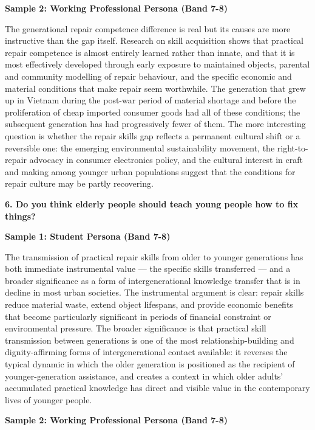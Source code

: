 \textbf{Sample 2: Working Professional Persona (Band 7-8)}

The generational repair competence difference is real but its causes are more instructive than the gap itself. Research on skill acquisition shows that practical repair competence is almost entirely learned rather than innate, and that it is most effectively developed through early exposure to maintained objects, parental and community modelling of repair behaviour, and the specific economic and material conditions that make repair seem worthwhile. The generation that grew up in Vietnam during the post-war period of material shortage and before the proliferation of cheap imported consumer goods had all of these conditions; the subsequent generation has had progressively fewer of them. The more interesting question is whether the repair skills gap reflects a permanent cultural shift or a reversible one: the emerging environmental sustainability movement, the right-to-repair advocacy in consumer electronics policy, and the cultural interest in craft and making among younger urban populations suggest that the conditions for repair culture may be partly recovering.

\separator

\begin{ieltsquestion}
\textbf{6. Do you think elderly people should teach young people how to fix things?}
\end{ieltsquestion}
\textbf{Sample 1: Student Persona (Band 7-8)}

The transmission of practical repair skills from older to younger generations has both immediate instrumental value — the specific skills transferred — and a broader significance as a form of intergenerational knowledge transfer that is in decline in most urban societies. The instrumental argument is clear: repair skills reduce material waste, extend object lifespans, and provide economic benefits that become particularly significant in periods of financial constraint or environmental pressure. The broader significance is that practical skill transmission between generations is one of the most relationship-building and dignity-affirming forms of intergenerational contact available: it reverses the typical dynamic in which the older generation is positioned as the recipient of younger-generation assistance, and creates a context in which older adults' accumulated practical knowledge has direct and visible value in the contemporary lives of younger people.

\textbf{Sample 2: Working Professional Persona (Band 7-8)}

